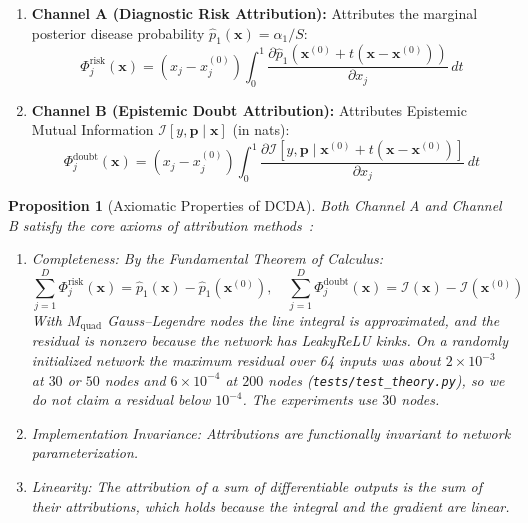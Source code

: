 \documentclass[pdflatex,sn-vancouver-num,referee,lineno]{sn-jnl}
\theoremstyle{thmstyleone}
\newtheorem{proposition}[theorem]{Proposition}
\theoremstyle{thmstylethree}
\begin{document}
\begin{enumerate}
    \item \textbf{Channel A (Diagnostic Risk Attribution):} Attributes the marginal posterior disease probability $\hat{p}_1(\mathbf{x}) = \alpha_1 / S$:
    \begin{equation}
        \Phi_{j}^{\text{risk}}(\mathbf{x}) = \left(x_j - x^{(0)}_j\right) \int_0^1 \frac{\partial \hat{p}_1\left(\mathbf{x}^{(0)} + t (\mathbf{x} - \mathbf{x}^{(0)})\right)}{\partial x_j} \, dt
    \end{equation}
    \item \textbf{Channel B (Epistemic Doubt Attribution):} Attributes Epistemic Mutual Information $\mathcal{I}[y, \mathbf{p} \mid \mathbf{x}]$ (in nats):
    \begin{equation}
        \Phi_{j}^{\text{doubt}}(\mathbf{x}) = \left(x_j - x^{(0)}_j\right) \int_0^1 \frac{\partial \mathcal{I}\left[y, \mathbf{p} \mid \mathbf{x}^{(0)} + t (\mathbf{x} - \mathbf{x}^{(0)})\right]}{\partial x_j} \, dt
    \end{equation}
\end{enumerate}

\begin{proposition}[Axiomatic Properties of DCDA]
\label{prop:dcda_axioms}
Both Channel A and Channel B satisfy the core axioms of attribution methods~\cite{sundararajan2017axiomatic}:
\begin{enumerate}
    \item \emph{Completeness:} By the Fundamental Theorem of Calculus:
    \begin{equation}
        \sum_{j=1}^D \Phi_{j}^{\text{risk}}(\mathbf{x}) = \hat{p}_1(\mathbf{x}) - \hat{p}_1\left(\mathbf{x}^{(0)}\right), \quad \sum_{j=1}^D \Phi_{j}^{\text{doubt}}(\mathbf{x}) = \mathcal{I}(\mathbf{x}) - \mathcal{I}\left(\mathbf{x}^{(0)}\right)
    \end{equation}
    With $M_{\text{quad}}$ Gauss--Legendre nodes the line integral is approximated, and the residual is nonzero because the network has LeakyReLU kinks. On a randomly initialized network the maximum residual over 64 inputs was about $2\times 10^{-3}$ at $30$ or $50$ nodes and $6\times 10^{-4}$ at $200$ nodes (\texttt{tests/test\_theory.py}), so we do not claim a residual below $10^{-4}$. The experiments use $30$ nodes.
    \item \emph{Implementation Invariance:} Attributions are functionally invariant to network parameterization.
    \item \emph{Linearity:} The attribution of a sum of differentiable outputs is the sum of their attributions, which holds because the integral and the gradient are linear.
\end{enumerate}
\end{proposition}
\end{document}
